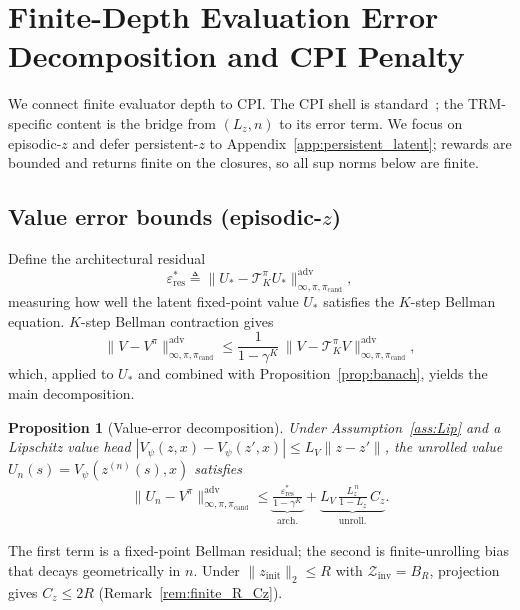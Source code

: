 \documentclass{article}
\theoremstyle{plain}
\newtheorem{proposition}[theorem]{Proposition}
\theoremstyle{definition}
\theoremstyle{remark}
\begin{document}
\section{Finite-Depth Evaluation Error Decomposition and CPI Penalty}
\label{sec:error_bounds}

We connect finite evaluator depth to CPI. The CPI shell is standard~\citep{KakadeLangford2002}; the TRM-specific content is the bridge from $(L_z,n)$ to its error term. We focus on episodic-$z$ and defer persistent-$z$ to Appendix~\ref{app:persistent_latent}; rewards are bounded and returns finite on the closures, so all sup norms below are finite.

\subsection{Value error bounds (episodic-$z$)}
\label{sec:value_error_bounds}

Define the architectural residual
\begin{equation}
\varepsilon_{\mathrm{res}}^* \triangleq \|U_* - \mathcal{T}^\pi_K U_*\|_{\infty,\pi,\pi_{\mathrm{cand}}}^{\mathrm{adv}},
\label{eq:eps_res_def}
\end{equation}
measuring how well the latent fixed-point value $U_*$ satisfies the $K$-step Bellman equation. $K$-step Bellman contraction gives
\begin{equation}
\|V - V^\pi\|_{\infty,\pi,\pi_{\mathrm{cand}}}^{\mathrm{adv}}
\le
\frac{1}{1-\gamma^K}\,
\|V-\mathcal{T}^\pi_K V\|_{\infty,\pi,\pi_{\mathrm{cand}}}^{\mathrm{adv}},
\label{eq:boundA}
\end{equation}
which, applied to $U_*$ and combined with Proposition~\ref{prop:banach}, yields the main decomposition.

\begin{proposition}[Value-error decomposition]
\label{prop:error_bounds}
Under Assumption~\ref{ass:Lip} and a Lipschitz value head $|V_\psi(z,x)-V_\psi(z',x)|\le L_V\|z-z'\|$, the unrolled value $U_n(s)=V_\psi(z^{(n)}(s),x)$ satisfies
\begin{align}
\|U_n - V^\pi\|_{\infty,\pi,\pi_{\mathrm{cand}}}^{\mathrm{adv}}
\le
\underbrace{\frac{\varepsilon_{\mathrm{res}}^*}{1-\gamma^K}}_{\text{arch.}}
+
\underbrace{L_V\,\frac{L_z^{\,n}}{1-L_z}\,C_z}_{\text{unroll.}}.
\label{eq:epsV_dials}
\end{align}
\end{proposition}

The first term is a fixed-point Bellman residual; the second is finite-unrolling bias that decays geometrically in $n$. Under $\|z_{\mathrm{init}}\|_2\le R$ with $\mathcal{Z}_{\mathrm{inv}}=B_R$, projection gives $C_z\le 2R$ (Remark~\ref{rem:finite_R_Cz}).
\end{document}

